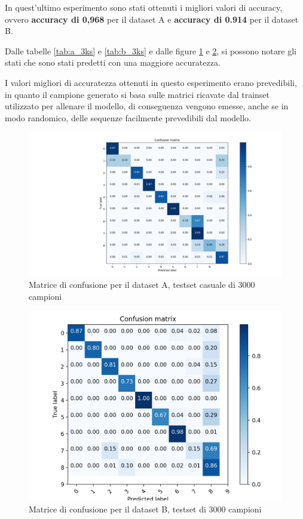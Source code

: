 \documentclass[10pt,a4paper]{article}
\begin{document}
	In quest'ultimo esperimento sono stati ottenuti i migliori valori di accuracy, ovvero \textbf{accuracy di 0,968} per il dataset A e \textbf{accuracy di 0.914} per il dataset B.

	Dalle tabelle \ref{tab:a_3ks} e \ref{tab:b_3ks} e dalle figure \ref{fig:a_3ks} e \ref{fig:b_3ks}, si possono notare gli stati che sono stati predetti con una maggiore accuratezza.

	I valori migliori di accuratezza ottenuti in questo esperimento erano prevedibili, in quanto il campione generato si basa sulle matrici ricavate dal trainset utilizzato per allenare il modello, di conseguenza vengono emesse, anche se in modo randomico, delle sequenze facilmente prevedibili dal modello.




	\begin{figure}[!htbp]
	\includegraphics[width=\linewidth]{immagini/confusion_matrix/a_3ks.png}
	\caption{Matrice di confusione per il dataset A, testset casuale di 3000 campioni}
	\label{fig:a_3ks}
	\end{figure}

	\begin{figure}[!htbp]
	\includegraphics[width=\linewidth]{immagini/confusion_matrix/b_3ks.png}
	\caption{Matrice di confusione per il dataset B, testset di 3000 campioni}
	\label{fig:b_3ks}
	\end{figure}
\end{document}
